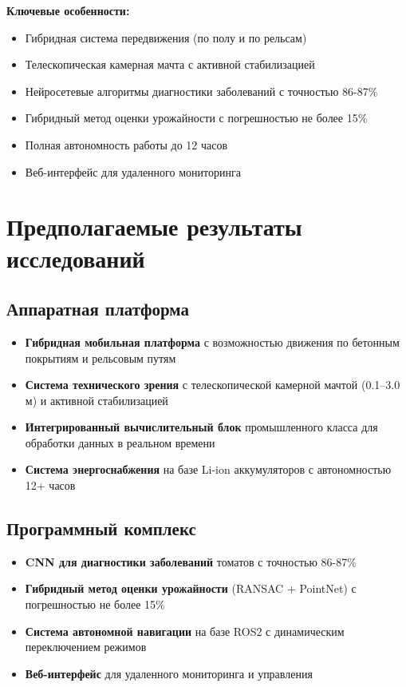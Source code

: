 \documentclass[12pt,a4paper]{article}
\begin{document}
\textbf{Ключевые особенности:}
\begin{itemize}
    \item Гибридная система передвижения (по полу и по рельсам)
    \item Телескопическая камерная мачта с активной стабилизацией
    \item Нейросетевые алгоритмы диагностики заболеваний с точностью 86-87\%
    \item Гибридный метод оценки урожайности с погрешностью не более 15\%
    \item Полная автономность работы до 12 часов
    \item Веб-интерфейс для удаленного мониторинга
\end{itemize}

\section{Предполагаемые результаты исследований}

\subsection{Аппаратная платформа}
\begin{itemize}
    \item \textbf{Гибридная мобильная платформа} с возможностью движения по бетонным покрытиям и рельсовым путям
    \item \textbf{Система технического зрения} с телескопической камерной мачтой (0.1–3.0 м) и активной стабилизацией
    \item \textbf{Интегрированный вычислительный блок} промышленного класса для обработки данных в реальном времени
    \item \textbf{Система энергоснабжения} на базе Li-ion аккумуляторов с автономностью 12+ часов
\end{itemize}

\subsection{Программный комплекс}
\begin{itemize}
    \item \textbf{CNN для диагностики заболеваний} томатов с точностью 86-87\%
    \item \textbf{Гибридный метод оценки урожайности} (RANSAC + PointNet) с погрешностью не более 15\%
    \item \textbf{Система автономной навигации} на базе ROS2 с динамическим переключением режимов
    \item \textbf{Веб-интерфейс} для удаленного мониторинга и управления
\end{itemize}
\end{document}
